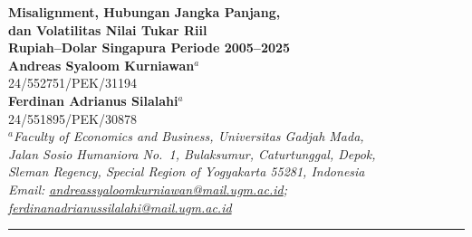 \documentclass[12pt]{article}
\begin{document}
{\LARGE \textbf{Misalignment, Hubungan Jangka Panjang,\\[0.3cm]
dan Volatilitas Nilai Tukar Riil\\[0.3cm]
Rupiah--Dolar Singapura Periode 2005--2025}}\\[1.2cm]

{\large \textbf{Andreas Syaloom Kurniawan}$^{a}$}\\[0.1cm]
{\small 24/552751/PEK/31194}\\[0.4cm]
{\large \textbf{Ferdinan Adrianus Silalahi}$^{a}$}\\[0.1cm]
{\small 24/551895/PEK/30878}\\[0.7cm]

{\small
$^{a}$\textit{Faculty of Economics and Business, Universitas Gadjah Mada,\\
Jalan Sosio Humaniora No.\ 1, Bulaksumur, Caturtunggal, Depok,\\
Sleman Regency, Special Region of Yogyakarta 55281, Indonesia}\\[0.2cm]
\textit{Email: \href{mailto:andreassyaloomkurniawan@mail.ugm.ac.id}{andreassyaloomkurniawan@mail.ugm.ac.id};
\href{mailto:ferdinanadrianussilalahi@mail.ugm.ac.id}{ferdinanadrianussilalahi@mail.ugm.ac.id}}
}\\[0.8cm]

\hrule
\vspace{0.8cm}
\end{document}
